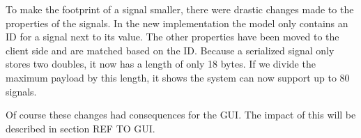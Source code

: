 To make the footprint of a signal smaller, there were drastic changes made to the properties of the signals. In the new implementation the model only contains an ID for a signal next to its value. The other properties have been moved to the client side and are matched based on the ID. Because a serialized signal only stores two doubles, it now has a length of only 18 bytes. If we divide the maximum payload by this length, it shows the system can now support up to 80 signals.
   
Of course these changes had consequences for the GUI. The impact of this will be described in section REF TO GUI.

